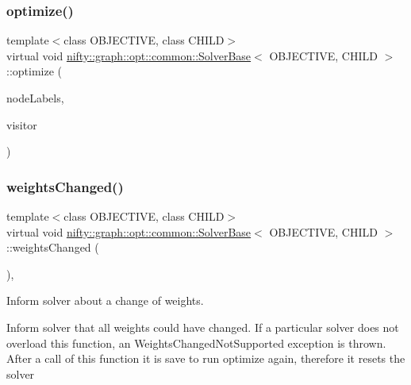 \subsubsection{\texorpdfstring{optimize()}{optimize()}}
{\footnotesize\ttfamily template$<$class O\+B\+J\+E\+C\+T\+I\+VE, class C\+H\+I\+LD$>$ \\
virtual void \hyperlink{classnifty_1_1graph_1_1opt_1_1common_1_1SolverBase}{nifty\+::graph\+::opt\+::common\+::\+Solver\+Base}$<$ O\+B\+J\+E\+C\+T\+I\+VE, C\+H\+I\+LD $>$\+::optimize (\begin{DoxyParamCaption}\item[{\hyperlink{classnifty_1_1graph_1_1opt_1_1common_1_1SolverBase_abefd51561de2fd009f6bed6bef6009ea}{Node\+Labels\+Type} \&}]{node\+Labels,  }\item[{\hyperlink{classnifty_1_1graph_1_1opt_1_1common_1_1SolverBase_ad9932afb08dd17d375de4b15da9ffaa6}{Visitor\+Base\+Type} $\ast$}]{visitor }\end{DoxyParamCaption})\hspace{0.3cm}{\ttfamily [pure virtual]}}

\mbox{\label{classnifty_1_1graph_1_1opt_1_1common_1_1SolverBase_a6a5d77ee514c4b5f44d1908c1000f0ff}} 
\subsubsection{\texorpdfstring{weights\+Changed()}{weightsChanged()}}
{\footnotesize\ttfamily template$<$class O\+B\+J\+E\+C\+T\+I\+VE, class C\+H\+I\+LD$>$ \\
virtual void \hyperlink{classnifty_1_1graph_1_1opt_1_1common_1_1SolverBase}{nifty\+::graph\+::opt\+::common\+::\+Solver\+Base}$<$ O\+B\+J\+E\+C\+T\+I\+VE, C\+H\+I\+LD $>$\+::weights\+Changed (\begin{DoxyParamCaption}{ }\end{DoxyParamCaption})\hspace{0.3cm}{\ttfamily [inline]}, {\ttfamily [virtual]}}



Inform solver about a change of weights. 

Inform solver that all weights could have changed. If a particular solver does not overload this function, an Weights\+Changed\+Not\+Supported exception is thrown. After a call of this function it is save to run optimize again, therefore it resets the solver 

